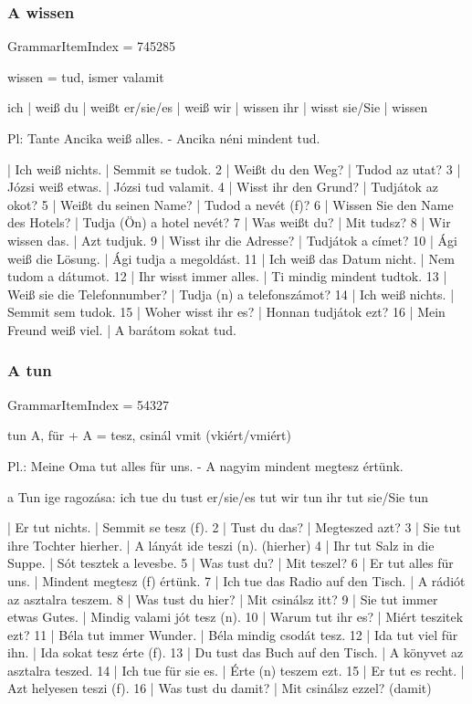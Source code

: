 \documentclass{article}
\newenvironment{desc}{\verbatim}{\endverbatim}
\newenvironment{exmp}{\verbatim}{\endverbatim}
\begin{document}
\subsubsection{A wissen}

GrammarItemIndex = 745285

\begin{desc}
wissen = tud, ismer valamit

ich       | weiß
du        | weißt
er/sie/es | weiß
wir       | wissen
ihr       | wisst
sie/Sie   | wissen

Pl: Tante Ancika weiß alles. - Ancika néni mindent tud.
\end{desc}

\begin{exmp}
1 | Ich weiß nichts. | Semmit se tudok.
2 | Weißt du den Weg? | Tudod az utat?
3 | Józsi weiß etwas. | Józsi tud valamit.
4 | Wisst ihr den Grund? | Tudjátok az okot?
5 | Weißt du seinen Name? | Tudod a nevét (f)?
6 | Wissen Sie den Name des Hotels? | Tudja (Ön) a hotel nevét?
7 | Was weißt du? | Mit tudsz?
8 | Wir wissen das. | Azt tudjuk.
9 | Wisst ihr die Adresse? | Tudjátok a címet?
10 | Ági weiß die Lösung. | Ági tudja a megoldást.
11 | Ich weiß das Datum nicht. | Nem tudom a dátumot.
12 | Ihr wisst immer alles. | Ti mindig mindent tudtok.
13 | Weiß sie die Telefonnumber? | Tudja (n) a telefonszámot?
14 | Ich weiß nichts. | Semmit sem tudok.
15 | Woher wisst ihr es? | Honnan tudjátok ezt?
16 | Mein Freund weiß viel. | A barátom sokat tud.
\end{exmp}

\subsubsection{A tun}

GrammarItemIndex = 54327

\begin{desc}
tun A, für + A = tesz, csinál vmit (vkiért/vmiért)

Pl.: Meine Oma tut alles für uns. - A nagyim mindent megtesz értünk.

a Tun ige ragozása:
ich tue
du tust
er/sie/es tut
wir tun
ihr tut
sie/Sie tun
\end{desc}

\begin{exmp}
1 | Er tut nichts. | Semmit se tesz (f).
2 | Tust du das? | Megteszed azt?
3 | Sie tut ihre Tochter hierher. | A lányát ide teszi (n). (hierher)
4 | Ihr tut Salz in die Suppe. | Sót tesztek a levesbe.
5 | Was tust du? | Mit teszel?
6 | Er tut alles für uns. | Mindent megtesz (f) értünk.
7 | Ich tue das Radio auf den Tisch. | A rádiót az asztalra teszem.
8 | Was tust du hier? | Mit csinálsz itt?
9 | Sie tut immer etwas Gutes. | Mindig valami jót tesz (n).
10 | Warum tut ihr es? | Miért teszitek ezt?
11 | Béla tut immer Wunder. | Béla mindig csodát tesz.
12 | Ida tut viel für ihn. | Ida sokat tesz érte (f).
13 | Du tust das Buch auf den Tisch. | A könyvet az asztalra teszed.
14 | Ich tue für sie es. | Érte (n) teszem ezt.
15 | Er tut es recht. | Azt helyesen teszi (f).
16 | Was tust du damit? | Mit csinálsz ezzel? (damit)
\end{exmp}
\end{document}
